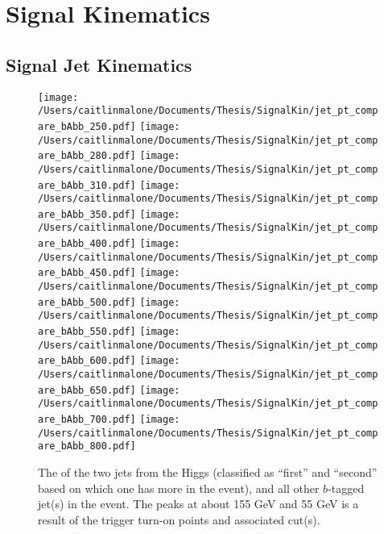  

\chapter[Signal Kinematics]{Signal Kinematics}
 
\section{Signal Jet Kinematics}
\begin{figure}[H]
    \texttt{[image: /Users/caitlinmalone/Documents/Thesis/SignalKin/jet\_pt\_compare\_bAbb\_250.pdf]}
    \texttt{[image: /Users/caitlinmalone/Documents/Thesis/SignalKin/jet\_pt\_compare\_bAbb\_280.pdf]}
    \texttt{[image: /Users/caitlinmalone/Documents/Thesis/SignalKin/jet\_pt\_compare\_bAbb\_310.pdf]}
    \newline
    \texttt{[image: /Users/caitlinmalone/Documents/Thesis/SignalKin/jet\_pt\_compare\_bAbb\_350.pdf]}
    \texttt{[image: /Users/caitlinmalone/Documents/Thesis/SignalKin/jet\_pt\_compare\_bAbb\_400.pdf]}
    \texttt{[image: /Users/caitlinmalone/Documents/Thesis/SignalKin/jet\_pt\_compare\_bAbb\_450.pdf]}
    \newline
    \texttt{[image: /Users/caitlinmalone/Documents/Thesis/SignalKin/jet\_pt\_compare\_bAbb\_500.pdf]}
    \texttt{[image: /Users/caitlinmalone/Documents/Thesis/SignalKin/jet\_pt\_compare\_bAbb\_550.pdf]}
    \texttt{[image: /Users/caitlinmalone/Documents/Thesis/SignalKin/jet\_pt\_compare\_bAbb\_600.pdf]}
    \newline
    \texttt{[image: /Users/caitlinmalone/Documents/Thesis/SignalKin/jet\_pt\_compare\_bAbb\_650.pdf]}
    \texttt{[image: /Users/caitlinmalone/Documents/Thesis/SignalKin/jet\_pt\_compare\_bAbb\_700.pdf]}
    \texttt{[image: /Users/caitlinmalone/Documents/Thesis/SignalKin/jet\_pt\_compare\_bAbb\_800.pdf]}
    \label{fig:pt_higgs_and_associated_jets}
    \caption{The \pt of the two jets from the Higgs (classified as ``first'' and ``second'' based
    on which one has more \pt in the event), and all other $b$-tagged jet(s) in the event.
    The peaks at about 155 GeV and 55 GeV is a result of the trigger turn-on points and
    associated cut(s).  }
\end{figure}


